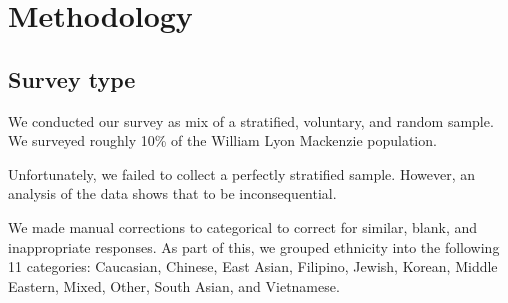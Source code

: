 \chapter{Methodology}

\section{Survey type}
We conducted our survey as mix of a stratified, voluntary, and random sample.
We surveyed roughly 10\% of the William Lyon Mackenzie population.

Unfortunately, we failed to collect a perfectly stratified sample.
However, an analysis of the data shows that to be inconsequential.

We made manual corrections to categorical to correct for similar, blank, and inappropriate responses.
As part of this, we grouped ethnicity into the following 11 categories: Caucasian, Chinese, East Asian, Filipino, Jewish, Korean, Middle Eastern, Mixed, Other, South Asian, and Vietnamese.
